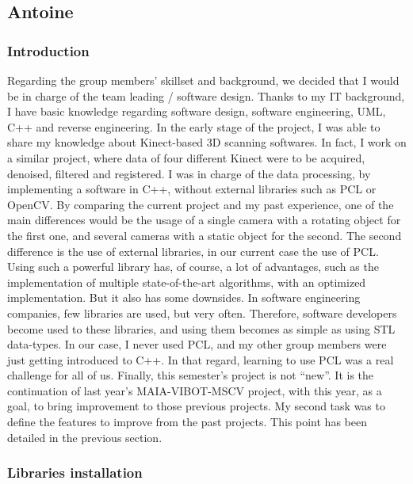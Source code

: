\documentclass[aps,letterpaper,11pt]{revtex4}
\begin{document}
\subsection{Antoine}
\subsubsection{Introduction}
Regarding the group members’ skillset and background, we decided that I would be in charge of the team leading / software design. Thanks to my IT background, I have basic knowledge regarding software design, software engineering, UML, C++ and reverse engineering. 
In the early stage of the project, I was able to share my knowledge about Kinect-based 3D scanning softwares. In fact, I work on a similar project, where data of four different Kinect were to be acquired, denoised, filtered and registered. I was in charge of the data processing, by implementing a software in C++, without external libraries such as PCL or OpenCV. By comparing the current project and my past experience, one of the main differences would be the usage of a single camera with a rotating object for the first one, and several cameras with a static object for the second.
The second difference is the use of external libraries, in our current case the use of PCL. Using such a powerful library has, of course, a lot of advantages, such as the implementation of multiple state-of-the-art algorithms, with an optimized implementation. But it also has some downsides. In software engineering companies, few libraries are used, but very often. Therefore, software developers become used to these libraries, and using them becomes as simple as using STL data-types. In our case, I never used PCL, and my other group members were just getting introduced to C++. In that regard, learning to use  PCL was a real challenge for all of us. 
Finally, this semester's project is not “new”. It is the continuation of last year’s MAIA-VIBOT-MSCV project, with this year, as a goal, to bring improvement to those previous projects. My second task was to define the features to improve from the past projects. This point has been detailed in the previous section.

\subsubsection{Libraries installation}
\end{document}
